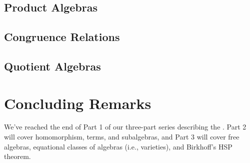 \documentclass[a4paper,UKenglish,cleveref,autoref,thm-restate]{../lipics-v2021-wjd}
\begin{document}
\subsection{Product Algebras}\label{sec:product-algebras}\firstsentence{\ualibProducts}{\urlProducts}

\subsection{Congruence Relations}\label{congruences}\firstsentence{\ualibCongruences}{\urlCongruences}

\subsection{Quotient Algebras}\label{quotient-algebras}




\section{Concluding Remarks}\label{sec:concluding-remarks}
We've reached the end of Part 1 of our three-part series describing the \agdaualib.  Part 2 will cover homomorphism, terms, and subalgebras, and Part 3 will cover free algebras, equational classes of algebras (i.e., varieties), and Birkhoff's HSP theorem.


\end{document}

